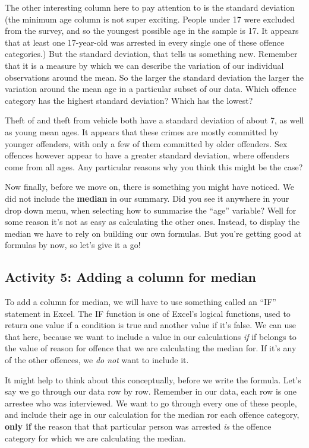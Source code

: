 \documentclass[]{book}
\theoremstyle{definition}
\theoremstyle{definition}
\theoremstyle{definition}
\theoremstyle{remark}
\begin{document}
The other interesting column here to pay attention to is the standard
deviation (the minimum age column is not super exciting. People under 17
were excluded from the survey, and so the youngest possible age in the
sample is 17. It appears that at least one 17-year-old was arrested in
every single one of these offence categories.) But the standard
deviation, that tells us something new. Remember that it is a measure by
which we can describe the variation of our individual observations
around the mean. So the larger the standard deviation the larger the
variation around the mean age in a particular subset of our data. Which
offence category has the highest standard deviation? Which has the
lowest?

Theft of and theft from vehicle both have a standard deviation of about
7, as well as young mean ages. It appears that these crimes are mostly
committed by younger offenders, with only a few of them committed by
older offenders. Sex offences however appear to have a greater standard
deviation, where offenders come from all ages. Any particular reasons
why you think this might be the case?

Now finally, before we move on, there is something you might have
noticed. We did not include the \textbf{median} in our summary. Did you
see it anywhere in your drop down menu, when selecting how to summarise
the ``age'' variable? Well for some reason it's not as easy as
calculating the other ones. Instead, to display the median we have to
rely on building our own formulas. But you're getting good at formulas
by now, so let's give it a go!

\hypertarget{activity-5-adding-a-column-for-median}{%
\subsection{Activity 5: Adding a column for
median}\label{activity-5-adding-a-column-for-median}}

 To add a column for median, we will have to use something called an
``IF'' statement in Excel. The IF function is one of Excel's logical
functions, used to return one value if a condition is true and another
value if it's false. We can use that here, because we want to include a
value in our calculations \emph{if} if belongs to the value of reason
for offence that we are calculating the median for. If it's any of the
other offences, we \emph{do not} want to include it.

It might help to think about this conceptually, before we write the
formula. Let's say we go through our data row by row. Remember in our
data, each row is one arrestee who was interviewed. We want to go
through every one of these people, and include their age in our
calculation for the median ror each offence category, \textbf{only if}
the reason that that particular person was arrested \emph{is} the
offence category for which we are calculating the median.
\end{document}
